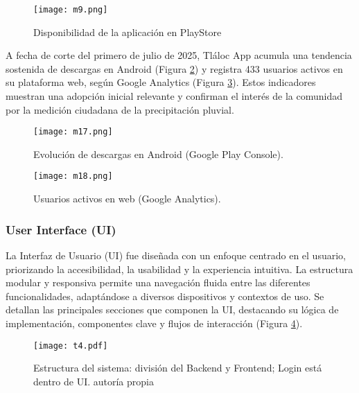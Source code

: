 \begin{figure}[h!]
\centering
  \texttt{[image: m9.png]}
  \caption{Disponibilidad de la aplicación en PlayStore}
  \label{m9}
\end{figure}



A fecha de corte del primero de julio de 2025, Tláloc App acumula una tendencia sostenida de descargas en Android (Figura \ref{m17}) y registra 433 usuarios activos en su plataforma web, según Google Analytics (Figura \ref{m18}). Estos indicadores muestran una adopción inicial relevante y confirman el interés de la comunidad por la medición ciudadana de la precipitación pluvial.

\begin{figure}[h!]
  \centering
  \texttt{[image: m17.png]}
  \caption{Evolución de descargas en Android (Google Play Console).}
  \label{m17}
\end{figure}

\begin{figure}[h!]
  \centering
  \texttt{[image: m18.png]}
  \caption{Usuarios activos en web (Google Analytics).}
  \label{m18}
\end{figure}







\newpage
\subsubsection{User Interface (UI)}
La Interfaz de Usuario (UI) fue diseñada con un enfoque centrado en el usuario, priorizando la accesibilidad, la usabilidad y la experiencia intuitiva. La estructura modular y responsiva permite una navegación fluida entre las diferentes funcionalidades, adaptándose a diversos dispositivos y contextos de uso. Se detallan las principales secciones que componen la UI, destacando su lógica de implementación, componentes clave y flujos de interacción (Figura \ref{m10}).

\begin{figure}[h!]
\centering
  \texttt{[image: t4.pdf]}
  \caption{Estructura del sistema: división del Backend y Frontend; Login está dentro de UI. autoría propia}
  \label{m10}
\end{figure}


